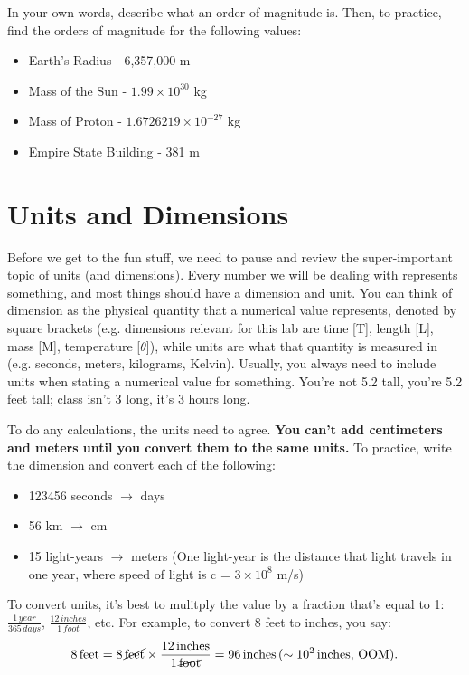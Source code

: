 \documentclass[12pt]{article}
\begin{document}
In your own words, describe what an order of magnitude is. Then, to practice, find the orders of magnitude for the following values: 

\begin{itemize}

\item{Earth's Radius - 6,357,000 m}
\item{Mass of the Sun - $1.99 \times 10^{30}$ kg}
\item{Mass of Proton - $1.6726219 \times 10^{-27}$ kg}
\item{Empire State Building - 381 m}
\end{itemize}

\section*{Units and Dimensions}

Before we get to the fun stuff, we need to pause and review the super-important topic of units (and dimensions). Every number we will be dealing with represents something, and most things should have a dimension and unit. You can think of dimension as the physical quantity that a numerical value represents, denoted by square brackets (e.g. dimensions relevant for this lab are time [T], length [L], mass [M], temperature [$\theta$]), while units are what that quantity is measured in (e.g. seconds, meters, kilograms, Kelvin). Usually, you always need to include units when stating a numerical value for something. You're not 5.2 tall, you're 5.2 feet tall; class isn't 3 long, it's 3 hours long. 

To do any calculations, the units need to agree. \textbf{You can't add centimeters and meters until you convert them to the same units.} To practice, write the dimension and convert each of the following:

\begin{itemize}
\item{123456 seconds $\rightarrow$ days}
\item{56 km $\rightarrow$ cm}
\item{15 light-years $\rightarrow$ meters (One light-year is the distance that light travels in one year, where speed of light is c = $3 \times 10^{8}$ m/s)}
\end{itemize}

To convert units, it's best to mulitply the value by a fraction that's equal to 1: $\frac{1 \,year}{365 \,days}$, $\frac{12 \,inches}{1 \,foot}$, etc. For example, to convert 8 feet to inches, you say:
$$ 8 \, \mathrm{feet} = 8 \, \cancel{\mathrm{feet}} \times  \frac{12 \,\mathrm{inches}}{1 \,\cancel{\mathrm{foot}}} = 96 \, \mathrm{inches} \, (\sim 10^2 \, \mathrm{inches, \, OOM}).$$
\end{document}
